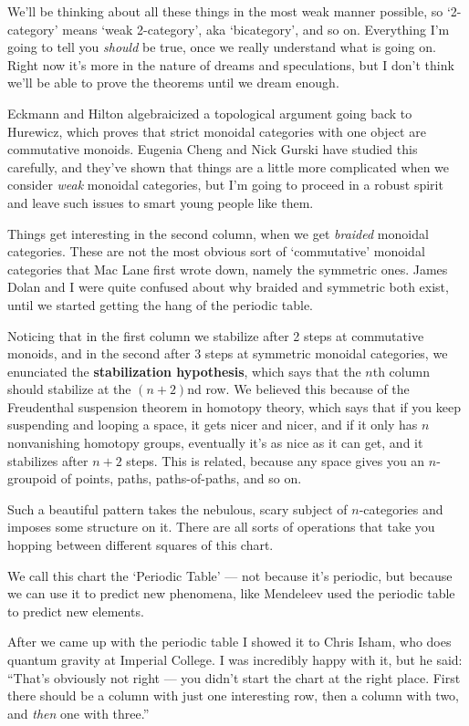 \documentclass{amsart}
\begin{document}
We'll be thinking about all these things in the most weak manner
possible, so `2-category' means `weak 2-category', aka
`bicategory', and so on.  Everything I'm going to tell you
\emph{should} be true, once we really understand what is going on.
Right now it's more in the nature of dreams and speculations, but I
don't think we'll be able to prove the theorems until we dream enough.

Eckmann and Hilton algebraicized a topological argument going back
to Hurewicz, which proves that strict monoidal categories with one object are
commutative monoids.  Eugenia Cheng and Nick Gurski have studied
this carefully, and they've shown that things are a little more
complicated when we consider \emph{weak} monoidal categories, 
but I'm going to proceed in a robust spirit and leave such issues
to smart young people like them.

Things get interesting in the second column, when we get \emph{braided}
monoidal categories.  These are not the most obvious sort of
`commutative' monoidal categories that Mac Lane first wrote down,
namely the symmetric ones.  James Dolan and I were quite
confused about why braided and symmetric both exist, until we started
getting the hang of the periodic table.  

Noticing that in the first column we stabilize after 2 steps at
commutative monoids, and in the second after 3 steps at symmetric
monoidal categories, we enunciated the {\bf stabilization hypothesis},
which says that the $n$th column should stabilize at the $(n+2)$nd
row.  We believed this because of the Freudenthal suspension theorem
in homotopy theory, which says that if you keep suspending and looping
a space, it gets nicer and nicer, and if it only has $n$ nonvanishing
homotopy groups, eventually it's as nice as it can get, and it
stabilizes after $n+2$ steps.  This is related, because any space
gives you an $n$-groupoid of points, paths, paths-of-paths, and so on.

Such a beautiful pattern takes the nebulous, scary subject of
$n$-categories and imposes some structure on it.  There are all sorts
of operations that take you hopping between different squares of this
chart.

We call this chart the `Periodic Table' --- not because it's periodic, 
but because we can use it to predict new phenomena, like Mendeleev used
the periodic table to predict new elements.

After we came up with the periodic table
I showed it to Chris Isham, who does quantum gravity at Imperial College.
I was incredibly happy with it, but he said: ``That's 
obviously not right --- you didn't start the chart at the right place.
First there should be a column with just one interesting row,
then a column with two, and {\it then} one with three.''  
\end{document}
